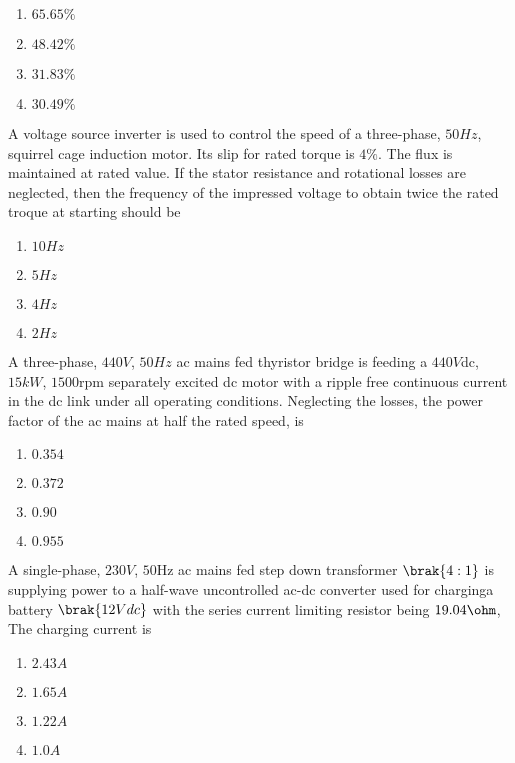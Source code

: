 \begin{multicols}{2}
\begin{enumerate}
    \item $65.65\%$
    \item $48.42\%$
    \item $31.83\%$
    \item $30.49\%$
\end{enumerate}    
\end{multicols}
\item A voltage source inverter is used to control the speed of a three-phase, $50Hz$, squirrel cage induction motor. Its slip for rated torque is $4\%$. The flux is maintained at rated value. If the stator resistance and rotational losses are neglected, then the frequency of the impressed voltage to obtain twice the rated troque at starting should be
\begin{multicols}{2}
\begin{enumerate}
    \item $10Hz$
    \item $5Hz$
    \item $4Hz$
    \item $2Hz$
\end{enumerate}    
\end{multicols}
\item A three-phase, $440V$, $50Hz$ ac mains fed thyristor bridge is feeding a $440 V$dc, $15kW$, $1500$rpm separately excited dc motor with a ripple free continuous current in the dc link under all operating conditions. Neglecting the losses, the power factor of the ac mains at half the rated speed, is 
\begin{multicols}{2}
\begin{enumerate}
    \item $0.354$
    \item $0.372$
    \item $0.90$
    \item $0.955$
\end{enumerate}    
\end{multicols}
\item A single-phase, $230V$, $50$Hz ac mains fed step down transformer $\brak{4:1}$ is supplying power to a half-wave uncontrolled ac-dc converter used for charginga battery $\brak{12Vdc}$ with the series current limiting resistor being $19.04\ohm$, The charging current is
\begin{multicols}{2}
\begin{enumerate}
    \item $2.43A$
    \item $1.65A$
    \item $1.22A$
    \item $1.0A$
\end{enumerate}    
\end{multicols}
